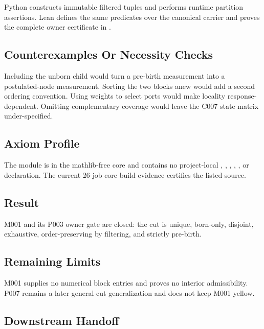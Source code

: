 Python constructs immutable filtered tuples and performs runtime
partition assertions. Lean defines the same predicates over the
canonical carrier and proves the complete owner certificate in
\texttt{\protect{}}.

\subsection{Counterexamples Or Necessity
Checks}\label{counterexamples-or-necessity-checks-4}

Including the unborn child would turn a pre-birth measurement into a
postulated-node measurement. Sorting the two blocks anew would add a
second ordering convention. Using weights to select ports would make
locality response-dependent. Omitting complementary coverage would leave
the C007 state matrix under-specified.

\subsection{Axiom Profile}\label{axiom-profile-4}

The module is in the mathlib-free core and contains no project-local
\texttt{\protect{}}, \texttt{\protect{}}, \texttt{\protect{}}, \texttt{\protect{}},
\texttt{\protect{}}, or \texttt{\protect{}} declaration. The current 26-job
core build evidence certifies the listed source.

\subsection{Result}\label{result-17}

M001 and its P003 owner gate are closed: the cut is unique, born-only,
disjoint, exhaustive, order-preserving by filtering, and strictly
pre-birth.

\subsection{Remaining Limits}\label{remaining-limits-4}

M001 supplies no numerical block entries and proves no interior
admissibility. P007 remains a later general-cut generalization and does
not keep M001 yellow.

\subsection{Downstream Handoff}\label{downstream-handoff-17}

